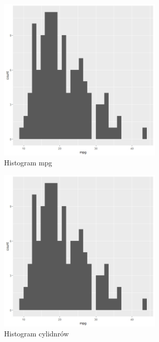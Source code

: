 \documentclass{article}
\begin{document}
            \begin{figure}[H]
                \caption{Histogram mpg}
                \centering
                \includegraphics[width=0.7\textwidth]{../histograms/mpg_hist.jpeg}
            \end{figure}
            \begin{figure}[H]
                \caption{Histogram cylidnrów}
                \centering
                \includegraphics[width=0.7\textwidth]{../histograms/mpg_hist.jpeg}
            \end{figure}
\end{document}
